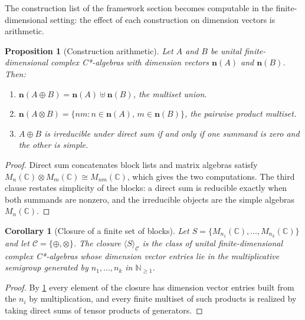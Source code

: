 \documentclass[11pt,letterpaper]{article}
\newtheorem{proposition}[theorem]{Proposition}
\newtheorem{corollary}[theorem]{Corollary}
\theoremstyle{definition}
\theoremstyle{remark}
\begin{document}
The construction list of the framework section becomes computable in the finite-dimensional setting: the effect of each construction on dimension vectors is arithmetic.

\begin{proposition}[Construction arithmetic]
\label{prop:construction-arithmetic}
Let $A$ and $B$ be unital finite-dimensional complex C*-algebras with dimension vectors $\mathbf{n}(A)$ and $\mathbf{n}(B)$. Then:
\begin{enumerate}
\item $\mathbf{n}(A \oplus B) = \mathbf{n}(A) \uplus \mathbf{n}(B)$, the multiset union.
\item $\mathbf{n}(A \otimes B) = \{ n m : n \in \mathbf{n}(A),\, m \in \mathbf{n}(B) \}$, the pairwise product multiset.
\item $A \oplus B$ is irreducible under direct sum if and only if one summand is zero and the other is simple.
\end{enumerate}
\end{proposition}

\begin{proof}
Direct sum concatenates block lists and matrix algebras satisfy $M_n(\mathbb{C}) \otimes M_m(\mathbb{C}) \cong M_{nm}(\mathbb{C})$, which gives the two computations. The third clause restates simplicity of the blocks: a direct sum is reducible exactly when both summands are nonzero, and the irreducible objects are the simple algebras $M_n(\mathbb{C})$.
\end{proof}

\begin{corollary}[Closure of a finite set of blocks]
\label{cor:closure}
Let $S = \{M_{n_1}(\mathbb{C}), \dots, M_{n_k}(\mathbb{C})\}$ and let $\mathcal{C} = \{\oplus, \otimes\}$. The closure $\langle S \rangle_{\mathcal{C}}$ is the class of unital finite-dimensional complex C*-algebras whose dimension vector entries lie in the multiplicative semigroup generated by $n_1, \dots, n_k$ in $\mathbb{N}_{\geq 1}$.
\end{corollary}

\begin{proof}
By \cref{prop:construction-arithmetic} every element of the closure has dimension vector entries built from the $n_i$ by multiplication, and every finite multiset of such products is realized by taking direct sums of tensor products of generators.
\end{proof}
\end{document}
